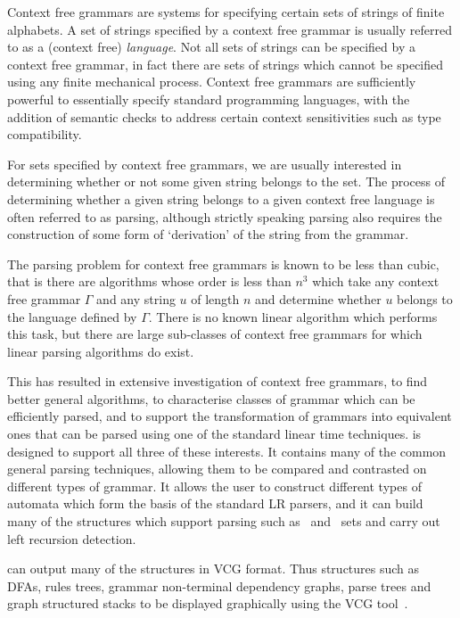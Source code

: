 
Context free grammars are systems for specifying certain sets of
strings of finite alphabets. A set of strings specified by a context
free grammar is usually referred to as a (context free) {\em language}.
Not all sets of strings can be specified
by a context free grammar, in fact there are sets of strings which
cannot be specified using any finite mechanical process. Context free
grammars are sufficiently powerful to essentially specify standard
programming languages, with the addition of semantic checks to address
certain context sensitivities such as type compatibility.

For sets specified by context free grammars, we are usually interested
in determining whether or not some given string belongs to the
set. The process of determining whether a given string belongs to a
given context free language is often referred to as parsing, although
strictly speaking parsing also requires the construction of some form
of `derivation' of the string from the grammar.

The parsing problem for context free grammars is known to be less than
cubic, that is there are algorithms whose order is less than $n^3$
which take any context free grammar $\Gamma$ and any string $u$ of 
length $n$ and determine whether $u$ belongs to the language defined
by $\Gamma$. There is no known linear algorithm which performs
this task, but there are large sub-classes of context free grammars
for which linear parsing algorithms do exist.

This has resulted in extensive investigation of context free grammars,
to find better general algorithms, to characterise classes of grammar
which can be efficiently parsed, and to support the transformation of
grammars into equivalent ones that can be parsed using one of the
standard linear time techniques. \gtb is designed to support all
three of these interests. It contains many of the common general
parsing techniques, allowing them to be compared and contrasted on
different types of grammar. It allows the user to construct
different types of automata which form the basis of the standard LR
parsers, and it can build many of the structures which support parsing
such as \first\ and \follow\ sets and carry out
left recursion detection.

\gtb can output many of the structures in VCG format. Thus 
structures such as DFAs, rules trees, grammar non-terminal dependency
graphs, parse trees and graph structured stacks to be displayed 
graphically using the VCG tool~\cite{SANDER95}.

